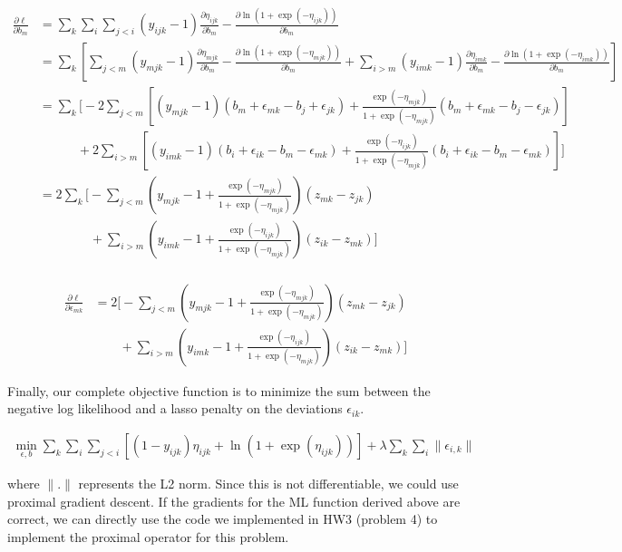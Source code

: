 \documentclass[11pt, oneside]{article}   	%
\begin{document}
\begin{align*}
\frac{\partial \ell}{\partial b_{m}} & =  \sum_k \sum_{i}  \sum_{j<i} (y_{ijk} -1)\frac{\partial \eta_{ijk}}{\partial b_{m}} - \frac{\partial \ln (1+\exp(-\eta_{ijk}))}{\partial b_{m}} \\
& =  \sum_k\left[ \sum_{j<m} (y_{mjk} -1)\frac{\partial \eta_{mjk}}{\partial b_{m}} - \frac{\partial \ln (1+\exp(-\eta_{mjk}))}{\partial b_{m}} +  \sum_{i > m} (y_{imk} -1)\frac{\partial \eta_{imk}}{\partial b_{m}} - \frac{\partial \ln (1+\exp(-\eta_{imk}))}{\partial b_{m}} \right] \\
%
& =  \sum_k\bigg[ -2 \sum_{j<m} \left[(y_{mjk} -1)(b_m + \epsilon_{mk} - b_j + \epsilon_{jk}) + \frac{\exp(-\eta_{mjk})}{1+\exp(-\eta_{mjk})}(b_m + \epsilon_{mk} - b_j - \epsilon_{jk}) \right] \\
& \quad\quad\quad +  2 \sum_{i > m} \left[(y_{imk} -1)(b_i + \epsilon_{ik} - b_m - \epsilon_{mk}) +\frac{\exp(-\eta_{ijk})}{1+\exp(-\eta_{mjk})}(b_i + \epsilon_{ik} - b_m - \epsilon_{mk}) \right] \bigg] \\
& =  2 \sum_k\bigg[ - \sum_{j<m} \left(y_{mjk} -1 + \frac{\exp(-\eta_{mjk})}{1+\exp(-\eta_{mjk})}\right)(z_{mk} - z_{jk})\\
& \quad\quad\quad\quad +  \sum_{i > m} \left(y_{imk} -1 + \frac{\exp(-\eta_{ijk})}{1+\exp(-\eta_{mjk})}\right)(z_{ik} - z_{mk}) \bigg] \\
%
\end{align*}

\begin{align*}
\frac{\partial \ell}{\partial \epsilon_{mk}} & = 2 \bigg[ - \sum_{j<m} \left(y_{mjk} -1 + \frac{\exp(-\eta_{mjk})}{1+\exp(-\eta_{mjk})}\right)(z_{mk} - z_{jk})\\
& \quad\quad +  \sum_{i > m} \left(y_{imk} -1 + \frac{\exp(-\eta_{ijk})}{1+\exp(-\eta_{mjk})}\right)(z_{ik} - z_{mk}) \bigg]
\end{align*}


Finally, our complete objective function is to minimize the sum between the negative log likelihood and a lasso penalty on the deviations $\epsilon_{ik}$.

\begin{align*}
\min_{\epsilon, b} \sum_k \sum_{i} \sum_{j < i} [ (1 - y_{ijk})\eta_{ijk} +  \ln (1+\exp(\eta_{ijk})) ] + \lambda \sum_k \sum_i \| \epsilon_{i,k}\|
\end{align*}

where $\|.\|$ represents the L2 norm. Since this is not differentiable, we could use proximal gradient descent. If the gradients for the ML function derived above are correct, we can directly use the code we implemented in HW3 (problem 4) to implement the proximal operator for this problem.
\end{document}
